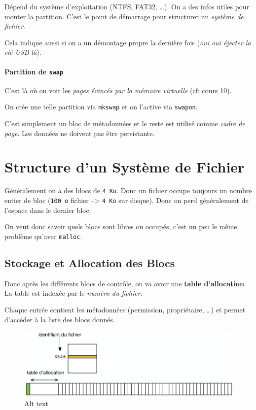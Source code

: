 Dépend du système d'exploitation (NTFS, FAT32, \ldots). On a des infos
utiles pour monter la partition. C'est le point de démarrage pour
structurer un \emph{système de fichier}.

Cela indique aussi si on a un démontage propre la dernière fois
(\emph{oui oui éjecter la clé USB là}).

\paragraph{\texorpdfstring{Partition de
\texttt{swap}}{Partition de swap}}\label{partition-de-swap}

C'est là où on voit les \emph{pages évincés par la mémoire virtuelle}
(cf: cours 10).

On crée une telle partition via \texttt{mkswap} et on l'active via
\texttt{swapon}.

C'est simplement un bloc de métadonnées et le reste est utilisé comme
\emph{cadre de page}. Les données ne doivent pas être persistante.

\section{Structure d'un Système de
Fichier}\label{structure-dun-systuxe8me-de-fichier}

Généralement on a des blocs de \texttt{4\ Ko}. Donc un fichier occupe
toujours un nombre entier de bloc (\texttt{100\ o} fichier
--\textgreater{} \texttt{4\ Ko} sur disque). Donc on perd généralement
de l'espace dans le dernier bloc.

On veut donc savoir quels blocs sont libres ou occupés, c'est un peu le
même problème qu'avec \texttt{malloc}.

\subsection{Stockage et Allocation des
Blocs}\label{stockage-et-allocation-des-blocs}

Donc après les différents blocs de contrôle, on va avoir une
\textbf{table d'allocation}. La table est indexée par le \emph{numéro du
fichier}.

Chaque entrée contient les métadonnées (permission, propriétaire,
\ldots) et permet d'accéder à la liste des blocs donnés.

\begin{figure}
\centering
\includegraphics{image-40.png}
\caption{Alt text}
\end{figure}

